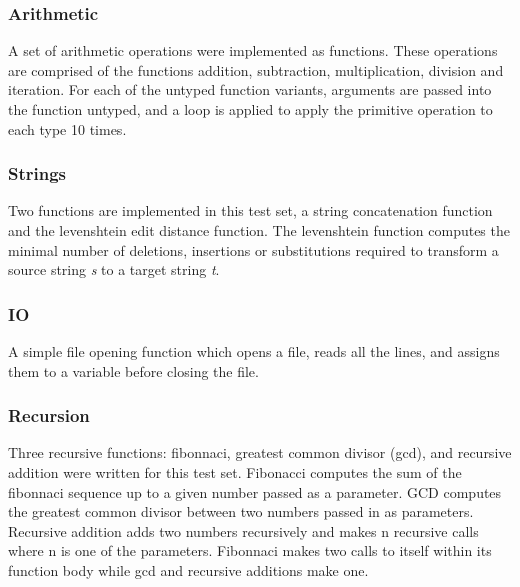 \subsubsection{Arithmetic}
A set of arithmetic operations were implemented as functions. These operations are comprised of the functions addition, subtraction, multiplication, division and iteration. For each of the untyped function variants, arguments are passed into the function untyped, and a loop is applied to apply the primitive operation to each type 10 times.

\subsubsection{Strings}
Two functions are implemented in this test set, a string concatenation function and the levenshtein edit distance function. The levenshtein function computes the minimal number of deletions, insertions or substitutions required to transform a source string \textit{s} to a target string \textit{t}.

\subsubsection{IO}
A simple file opening function which opens a file, reads all the lines, and assigns them to a variable before closing the file.

\subsubsection{Recursion}
Three recursive functions: fibonnaci, greatest common divisor (gcd), and recursive addition were written for this test set. Fibonacci computes the sum of the fibonnaci sequence up to a given number passed as a parameter. GCD computes the greatest common divisor between two numbers passed in as parameters. Recursive addition adds two numbers recursively and makes n recursive calls where n is one of the parameters. Fibonnaci makes two calls to itself within its function body while gcd and recursive additions make one. 
